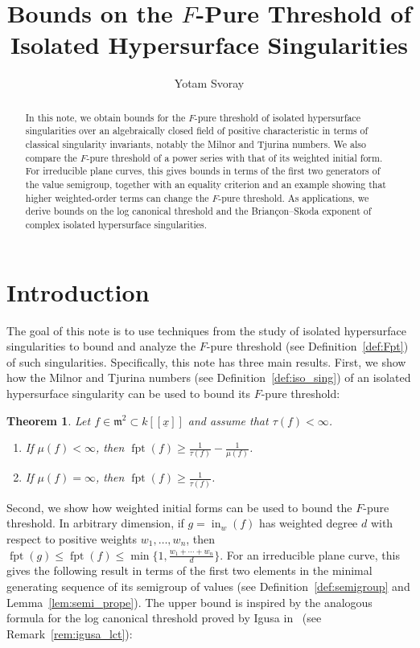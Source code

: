 \documentclass{article}
\title{Bounds on the $F$-Pure Threshold of Isolated Hypersurface Singularities}
\author{Yotam Svoray}
\date{}
\newtheorem{theorem}{Theorem}
\DeclareMathOperator{\fpt}{fpt}
\numberwithin{theorem}{section}
\begin{document}
\maketitle

\begin{abstract}
In this note, we obtain bounds for the $F$-pure threshold of isolated hypersurface singularities over an algebraically closed field of positive characteristic in terms of classical singularity invariants, notably the Milnor and Tjurina numbers. We also compare the $F$-pure threshold of a power series with that of its weighted initial form. For irreducible plane curves, this gives bounds in terms of the first two generators of the value semigroup, together with an equality criterion and an example showing that higher weighted-order terms can change the $F$-pure threshold. As applications, we derive bounds on the log canonical threshold and the Brian{\c{c}}on--Skoda exponent of complex isolated hypersurface singularities.
\end{abstract}

\section{Introduction}

The goal of this note is to use techniques from the study of isolated hypersurface singularities to bound and analyze the $F$-pure threshold (see Definition~\ref{def:Fpt}) of such singularities. Specifically, this note has three main results. First, we show how the Milnor and Tjurina numbers (see Definition~\ref{def:iso_sing}) of an isolated hypersurface singularity can be used to bound its $F$-pure threshold:

\begin{theorem}\label{ThmA}
Let $f\in\mathfrak{m}^2\subset k[[\underline{x}]]$ and assume that $\tau(f)<\infty$.
\begin{enumerate}
    \item\label{thm:fpt_milnor} If $\mu(f)<\infty$, then $\fpt(f)\geq\frac{1}{\tau(f)}-\frac{1}{\mu(f)}$.
    \item\label{cor:mil_infinite} If $\mu(f)=\infty$, then $\fpt(f)\geq\frac{1}{\tau(f)}$.
\end{enumerate}
\end{theorem}

Second, we show how weighted initial forms can be used to bound the $F$-pure threshold. In arbitrary dimension, if $g=\operatorname{in}_w(f)$ has weighted degree $d$ with respect to positive weights $w_1,\dots,w_n$, then $\fpt(g)\leq\fpt(f)\leq\min\{1,\frac{w_1+\cdots+w_n}{d}\}$. For an irreducible plane curve, this gives the following result in terms of the first two elements in the minimal generating sequence of its semigroup of values (see Definition~\ref{def:semigroup} and Lemma~\ref{lem:semi_prope}). The upper bound is inspired by the analogous formula for the log canonical threshold proved by Igusa in~\cite{igusa1977first} (see Remark~\ref{rem:igusa_lct}):
\end{document}
